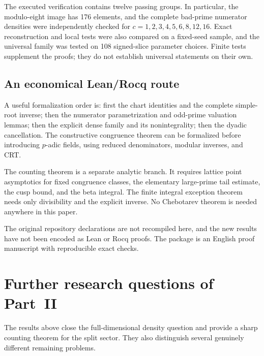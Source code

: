 \documentclass[11pt]{article}
\numberwithin{equation}{section}
\theoremstyle{plain}
\theoremstyle{plain}
\theoremstyle{plain}
\theoremstyle{definition}
\theoremstyle{definition}
\theoremstyle{definition}
\theoremstyle{remark}
\begin{document}
The executed verification contains twelve passing groups. In particular,
the modulo-eight image has 176 elements, and the complete bad-prime
numerator densities were independently checked for
$c=1,2,3,4,5,6,8,12,16$. Exact reconstruction and local tests were also
compared on a fixed-seed sample, and the universal family was tested on
108 signed-slice parameter choices. Finite tests supplement the proofs;
they do not establish universal statements on their own.

\subsection{An economical Lean/Rocq route}
A useful formalization order is: first the chart identities and the
complete simple-root inverse; then the numerator parametrization and
odd-prime valuation lemmas; then the explicit dense family and its
nonintegrality; then the dyadic cancellation. The constructive
congruence theorem can be formalized before introducing $p$-adic fields,
using reduced denominators, modular inverses, and CRT.

The counting theorem is a separate analytic branch. It requires lattice
point asymptotics for fixed congruence classes, the elementary large-prime
tail estimate, the cusp bound, and the beta integral. The finite integral
exception theorem needs only divisibility and the explicit inverse.
No Chebotarev theorem is needed anywhere in this paper.

The original repository declarations are not recompiled here, and the
new results have not been encoded as Lean or Rocq proofs. The package is
an English proof manuscript with reproducible exact checks.

\section{Further research questions of Part~II}\label{alg:dh:sec:questions}
The results above close the full-dimensional density question and provide
a sharp counting theorem for the split sector. They also distinguish
several genuinely different remaining problems.
\end{document}
